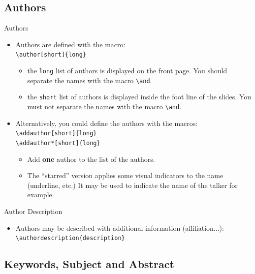 \documentclass[english,sectioncirclenumberstyle]{ciadbeamer}
\begin{document}
\subsection{Authors}

\begin{frame}{Authors}
	\begin{itemize}
	\item Authors are defined with the macro: \\
		\texttt{{\textbackslash}author[short]\{long\}}
		\begin{itemize}
		\item the \texttt{long} list of authors is displayed on the front page. You should separate the names with the macro \texttt{{\textbackslash}and}.
		\item the \texttt{short} list of authors is displayed inside the foot line of the slides. You \alert{must not separate} the names with the macro \texttt{{\textbackslash}and}.
		\end{itemize}
	\vfill
	\item \alert{Alternatively}, you could define the authors with the macros: \\
		\texttt{{\textbackslash}addauthor[short]\{long\}} \\
		\texttt{{\textbackslash}addauthor*[short]\{long\}}
		\begin{itemize}
		\item Add \textbf{one} author to the list of the authors.
		\item The ``starred'' version applies some visual indicators to the name (underline, etc.) It may be used to indicate the name of the talker for example.
		\end{itemize}
	\end{itemize}
	\vfill
\end{frame}

\begin{frame}{Author Description}
	\begin{itemize}
	\item Authors may be described with additional information (affiliation...): \\
		\texttt{{\textbackslash}authordescription\{description\}}
	\end{itemize}
	\vfill
\end{frame}

\subsection{Keywords, Subject and Abstract}
\end{document}
